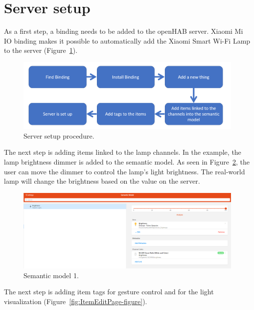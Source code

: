 \section{Server setup}
As a first step, a binding needs to be added to the openHAB server. Xiaomi Mi IO binding makes it possible to automatically add the Xiaomi Smart Wi-Fi Lamp to the server (Figure~\ref{fig:ServerSetupProcedure-figure}).

\begin{figure}
  \centering
  \includegraphics[width = 0.9 \linewidth]{figures/ServerSetupProcedure.png}
  \caption{Server setup procedure.}
  \label{fig:ServerSetupProcedure-figure}
\end{figure}

The next step is adding items linked to the lamp channels. In the example, the lamp brightness dimmer is added to the semantic model. As seen in Figure~\ref{fig:SemanticModelOne-figure}, the user can move the dimmer to control the lamp's light brightness. The real-world lamp will change the brightness based on the value on the server.

\begin{figure}
  \centering
  \includegraphics[width = 0.9 \linewidth]{figures/SemanticModelOne.png}
  \caption{Semantic model 1.}
  \label{fig:SemanticModelOne-figure}
\end{figure}

The next step is adding item tags for gesture control and for the light visualization (Figure~\ref{fig:ItemEditPage-figure}).

